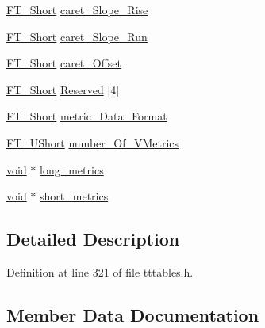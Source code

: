 \begin{DoxyCompactItemize}
\mbox{\hyperlink{fttypes_8h_aa7279be89046a2563cd3d4d6651fbdcf}{F\+T\+\_\+\+Short}} \mbox{\hyperlink{struct_t_t___vert_header___a3218533a7d8ac5a8ebd70a970cbdbbcc}{caret\+\_\+\+Slope\+\_\+\+Rise}}
\item 
\mbox{\hyperlink{fttypes_8h_aa7279be89046a2563cd3d4d6651fbdcf}{F\+T\+\_\+\+Short}} \mbox{\hyperlink{struct_t_t___vert_header___a98ff91b532d827440f7140d3071d473d}{caret\+\_\+\+Slope\+\_\+\+Run}}
\item 
\mbox{\hyperlink{fttypes_8h_aa7279be89046a2563cd3d4d6651fbdcf}{F\+T\+\_\+\+Short}} \mbox{\hyperlink{struct_t_t___vert_header___a89ff9369f61dc5b770cde0eda954d402}{caret\+\_\+\+Offset}}
\item 
\mbox{\hyperlink{fttypes_8h_aa7279be89046a2563cd3d4d6651fbdcf}{F\+T\+\_\+\+Short}} \mbox{\hyperlink{struct_t_t___vert_header___a54930b56bb8be0a8eb22753a9242fc5f}{Reserved}} \mbox{[}4\mbox{]}
\item 
\mbox{\hyperlink{fttypes_8h_aa7279be89046a2563cd3d4d6651fbdcf}{F\+T\+\_\+\+Short}} \mbox{\hyperlink{struct_t_t___vert_header___aa7c3983f62f7bf736eaaaae684b65dd7}{metric\+\_\+\+Data\+\_\+\+Format}}
\item 
\mbox{\hyperlink{fttypes_8h_a937f6c17cf5ffd09086d8610c37b9f58}{F\+T\+\_\+\+U\+Short}} \mbox{\hyperlink{struct_t_t___vert_header___a4ca6fe9cdd12fbc9a1129c4fbf6bddd1}{number\+\_\+\+Of\+\_\+\+V\+Metrics}}
\item 
\mbox{\hyperlink{_s_d_l__opengles2__gl2ext_8h_ae5d8fa23ad07c48bb609509eae494c95}{void}} $\ast$ \mbox{\hyperlink{struct_t_t___vert_header___ac789245d0d6243bc965ad43702bdc671}{long\+\_\+metrics}}
\item 
\mbox{\hyperlink{_s_d_l__opengles2__gl2ext_8h_ae5d8fa23ad07c48bb609509eae494c95}{void}} $\ast$ \mbox{\hyperlink{struct_t_t___vert_header___ad5e875c19a02b0f6777db1c122bff2f3}{short\+\_\+metrics}}
\end{DoxyCompactItemize}


\subsection{Detailed Description}


Definition at line 321 of file tttables.\+h.



\subsection{Member Data Documentation}
\mbox{\label{struct_t_t___vert_header___a7a2acbd1abd4cc4d6f40110203f99d0f}} 
